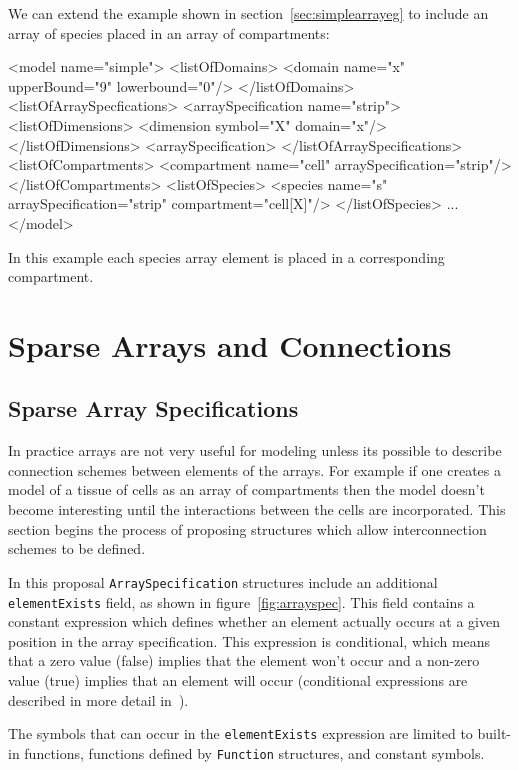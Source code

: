 \documentclass{cekarticle}
\begin{document}
We can extend the example shown in
section~\ref{sec:simplearrayeg} to include an array of species
placed in an array of compartments:
\begin{example}
<model name="simple">
    <listOfDomains>
        <domain name="x" upperBound="9" lowerbound="0"/>
    </listOfDomains>
    <listOfArraySpecfications>
        <arraySpecification name="strip">
            <listOfDimensions>
                <dimension symbol="X" domain="x"/>
            </listOfDimensions>
        <arraySpecification>
    </listOfArraySpecifications>
    <listOfCompartments>
        <compartment name="cell" arraySpecification="strip"/>
    </listOfCompartments>
    <listOfSpecies>
        <species
            name="s" arraySpecification="strip" compartment="cell[X]"/>
    </listOfSpecies>
    ...
</model>
\end{example}
In this example each species array element is placed in a
corresponding compartment.

\section{Sparse Arrays and Connections}

\subsection{Sparse Array Specifications}

In practice arrays are not very useful for modeling unless its
possible to describe connection schemes between elements of the
arrays.  For example if one creates a model of a tissue of cells
as an array of compartments then the model doesn't become
interesting until the interactions between the cells are
incorporated.  This section begins the process of proposing
structures which allow interconnection schemes to be defined.

In this proposal \texttt{ArraySpecification} structures include
an additional \texttt{elementExists} field, as shown in
figure~\ref{fig:arrayspec}.  This field contains a constant
expression which defines whether an element actually occurs at a
given position in the array specification.  This expression is
conditional, which means that a zero value (false) implies that
the element won't occur and a non-zero value (true) implies that
an element will occur (conditional expressions are described in
more detail in~\citet{finney:2002c}).

The symbols that can occur in the \texttt{elementExists}
expression are limited to built-in functions, functions defined
by \texttt{Function} structures, and constant symbols.
\end{document}

